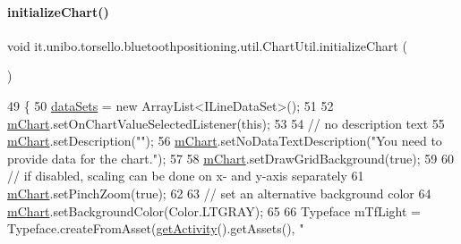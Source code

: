 \paragraph{\texorpdfstring{initialize\+Chart()}{initializeChart()}}
{\footnotesize\ttfamily void it.\+unibo.\+torsello.\+bluetoothpositioning.\+util.\+Chart\+Util.\+initialize\+Chart (\begin{DoxyParamCaption}{ }\end{DoxyParamCaption})\hspace{0.3cm}{\ttfamily [private]}}


\begin{DoxyCode}
49                                    \{
50         \hyperlink{classit_1_1unibo_1_1torsello_1_1bluetoothpositioning_1_1util_1_1ChartUtil_aa98bcaa2d5ba444b91cdc029768d380a_aa98bcaa2d5ba444b91cdc029768d380a}{dataSets} = \textcolor{keyword}{new} ArrayList<ILineDataSet>();
51 
52         \hyperlink{classit_1_1unibo_1_1torsello_1_1bluetoothpositioning_1_1util_1_1ChartUtil_a60b5bd6796cc5dcde12d9a6bb3e67c86_a60b5bd6796cc5dcde12d9a6bb3e67c86}{mChart}.setOnChartValueSelectedListener(\textcolor{keyword}{this});
53 
54         \textcolor{comment}{// no description text}
55         \hyperlink{classit_1_1unibo_1_1torsello_1_1bluetoothpositioning_1_1util_1_1ChartUtil_a60b5bd6796cc5dcde12d9a6bb3e67c86_a60b5bd6796cc5dcde12d9a6bb3e67c86}{mChart}.setDescription(\textcolor{stringliteral}{""});
56         \hyperlink{classit_1_1unibo_1_1torsello_1_1bluetoothpositioning_1_1util_1_1ChartUtil_a60b5bd6796cc5dcde12d9a6bb3e67c86_a60b5bd6796cc5dcde12d9a6bb3e67c86}{mChart}.setNoDataTextDescription(\textcolor{stringliteral}{"You need to provide data for the chart."});
57 
58         \hyperlink{classit_1_1unibo_1_1torsello_1_1bluetoothpositioning_1_1util_1_1ChartUtil_a60b5bd6796cc5dcde12d9a6bb3e67c86_a60b5bd6796cc5dcde12d9a6bb3e67c86}{mChart}.setDrawGridBackground(\textcolor{keyword}{true});
59 
60         \textcolor{comment}{// if disabled, scaling can be done on x- and y-axis separately}
61         \hyperlink{classit_1_1unibo_1_1torsello_1_1bluetoothpositioning_1_1util_1_1ChartUtil_a60b5bd6796cc5dcde12d9a6bb3e67c86_a60b5bd6796cc5dcde12d9a6bb3e67c86}{mChart}.setPinchZoom(\textcolor{keyword}{true});
62 
63         \textcolor{comment}{// set an alternative background color}
64         \hyperlink{classit_1_1unibo_1_1torsello_1_1bluetoothpositioning_1_1util_1_1ChartUtil_a60b5bd6796cc5dcde12d9a6bb3e67c86_a60b5bd6796cc5dcde12d9a6bb3e67c86}{mChart}.setBackgroundColor(Color.LTGRAY);
65 
66         Typeface mTfLight = Typeface.createFromAsset(\hyperlink{classit_1_1unibo_1_1torsello_1_1bluetoothpositioning_1_1util_1_1ChartUtil_a59150a6d20b6d0ad2fcf8c1ba858d355_a59150a6d20b6d0ad2fcf8c1ba858d355}{getActivity}().getAssets(), \textcolor{stringliteral}{"
}
\end{DoxyCode}
